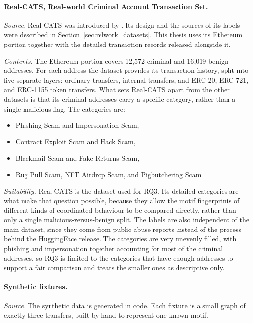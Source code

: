\documentclass{thesisclass}
\begin{document}
\paragraph{Real-CATS, Real-world Criminal Account Transaction Set.}
\label{sec:dataset_realcats}
\textit{Source.} Real-CATS was introduced by \citet{shi2025realcats}. Its design
and the sources of its labels were described in
Section~\ref{sec:relwork_datasets}. This thesis uses its Ethereum portion
together with the detailed transaction records released alongside it.

\textit{Contents.} The Ethereum portion covers 12{,}572 criminal and 16{,}019
benign addresses. For each address the dataset provides its transaction history,
split into five separate layers: ordinary transfers, internal transfers, and
ERC-20, ERC-721, and ERC-1155 token transfers. What sets Real-CATS apart from
the other datasets is that its criminal addresses carry a specific category,
rather than a single malicious flag. The categories are:
\begin{itemize}
  \item Phishing Scam and Impersonation Scam,
  \item Contract Exploit Scam and Hack Scam,
  \item Blackmail Scam and Fake Returns Scam,
  \item Rug Pull Scam, NFT Airdrop Scam, and Pigbutchering Scam.
\end{itemize}

\textit{Suitability.} Real-CATS is the dataset used for RQ3. Its detailed
categories are what make that question possible, because they allow the motif
fingerprints of different kinds of coordinated behaviour to be compared directly,
rather than only a single malicious-versus-benign split. The labels are also
independent of the main dataset, since they come from public abuse reports
instead of the process behind the HuggingFace release. The categories are very
unevenly filled, with phishing and impersonation together accounting for most of
the criminal addresses, so RQ3 is limited to the categories that have enough
addresses to support a fair comparison and treats the smaller ones as
descriptive only.

\paragraph{Synthetic fixtures.}
\label{sec:dataset_synthetic}
\textit{Source.} The synthetic data is generated in code. Each fixture is a
small graph of exactly three transfers, built by hand to represent one known
motif.
\end{document}
